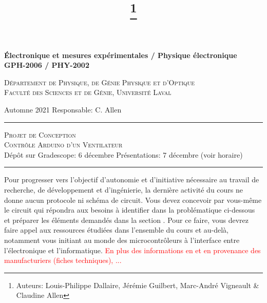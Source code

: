 \documentclass[english,french,12pt]{article}
\title{\vspace{-7em}\thanks{Auteurs: Louis-Philippe Dallaire, Jérémie Guilbert, Marc-André Vigneault \& Claudine Allen}}
\date{}
\begin{document}
\maketitle\thispagestyle{fancy}
%
%
\begin{center}
    \textbf{\large{Électronique et mesures expérimentales / Physique électronique}}\\
    \vspace{0.2em}
    \textbf{GPH-2006 / PHY-2002}

    \textsc{Département de Physique, de Génie Physique et d'Optique\\
    Faculté des Sciences et de Génie, Université Laval}
\end{center}

\vspace{-1em}
\noindent Automne 2021 \hfill Responsable: C. Allen\par
\vspace{0.2em}
\hrule
\vspace{0.5em}
\centering
    \textsc{Projet de Conception\\
    Contrôle Arduino d'un Ventilateur}\\
\vspace{0.5em}
{Dépôt sur Gradescope: 6 décembre \hfill Présentations: 7 décembre (voir horaire)}\par
\vspace{0.4em}
\hrule
\justify

Pour progresser vers l'objectif d'autonomie et d'initiative nécessaire au travail de recherche, de développement et d'ingénierie, la dernière activité du cours ne donne aucun protocole ni schéma de circuit. Vous devez concevoir par vous-même le circuit qui répondra aux besoins à identifier dans la problématique ci-dessous et préparer les éléments demandés dans la section . Pour ce faire, vous devrez faire appel aux ressources étudiées dans l'ensemble du cours et au-delà, notamment vous initiant au monde des microcontrôleurs à l'interface entre l'électronique et l'informatique. \textcolor{red}{En plus des informations en  et en provenance des manufacturiers (fiches techniques), ...}

\vspace{-1em}
\end{document}
